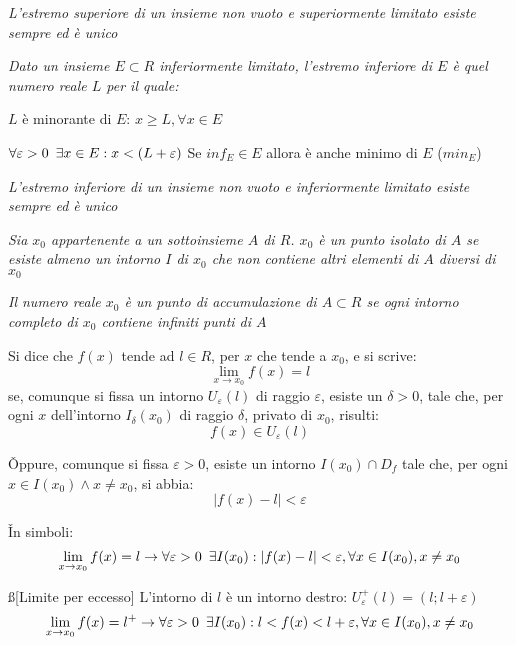 \documentclass[12pt]{article}
\begin{document}
\v

\textit{L'estremo superiore di un insieme non vuoto e superiormente limitato esiste sempre ed è unico}

\textit{Dato un insieme $E \subset R$ inferiormente limitato, l'estremo inferiore di $E$ è quel numero reale $L$ per il quale:}
\bi
    \item $L$ è minorante di $E$: $x \geq L, \forall x \in E $
    \item $ \forall \varepsilon > 0 \hspace{0.5em} \exists x \in E: x < (L + \varepsilon)$
\ei
Se $inf_E \in E$ allora è anche minimo di $E$ ($min_E$)

\v

\textit{L'estremo inferiore di un insieme non vuoto e inferiormente limitato esiste sempre ed è unico}

\textit{Sia $x_0$ appartenente a un sottoinsieme $A$ di $R$. $x_0$ è un punto isolato di $A$ se esiste almeno un intorno $I$ di $x_0$ che non contiene altri elementi di $A$ diversi di $x_0$}

\textit{Il numero reale $x_0$ è un punto di accumulazione di $A \subset R$ se ogni intorno completo di $x_0$ contiene infiniti punti di $A$}

\s[Limite]
Si dice che $f(x)$ tende ad $l \in R$, per $x$ che tende a $x_0$, e si scrive:
$$ \lim_{x \to x_0} f(x) = l $$
se, comunque si fissa un intorno $U_{\varepsilon}(l)$ di raggio $\varepsilon$, esiste un $\delta > 0$, tale che, per ogni $x$ dell'intorno $I_{\delta}(x_0)$ di raggio $\delta$, privato di $x_0$, risulti:
$$ f(x) \in U_{\varepsilon}(l) $$

\v

Oppure, comunque si fissa $\varepsilon > 0$, esiste un intorno $I(x_0) \cap D_f$ tale che, per ogni $x \in I(x_0) \wedge x\neq x_0$, si abbia:
$$ |f(x) - l| < \varepsilon $$

\v

In simboli:
$$ \lim_{x \to x_0} f(x) = l \rightarrow \forall \varepsilon > 0 \hspace{0.5em} \exists I(x_0): |f(x)-l| < \varepsilon, \forall x \in I(x_0), x\neq x_0 $$

\ss[Limite per eccesso]
L'intorno di $l$ è un intorno destro: $U_{\varepsilon}^{+}(l) = (l; l+\varepsilon)$
$$ \lim_{x \to x_0} f(x) = l^{+} \rightarrow \forall \varepsilon > 0 \hspace{0.5em} \exists I(x_0): l < f(x) < l + \varepsilon, \forall x \in I(x_0), x\neq x_0 $$
\end{document}

